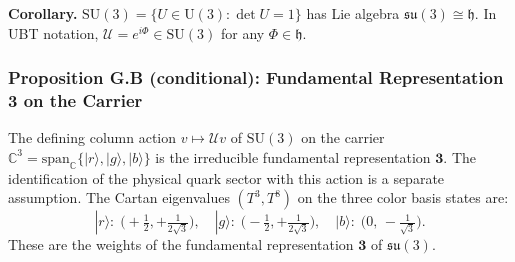 \begin{tcolorbox}[colback=blue!3!white,colframe=blue!40!black]
\textbf{Corollary.}
$\mathrm{SU}(3)=\{U\in\mathrm{U}(3):\det U=1\}$ has Lie algebra $\mathfrak{su}(3)\cong\mathfrak{h}$.
In UBT notation, $\mathcal{U}=e^{i\Phi}\in\mathrm{SU}(3)$ for any $\Phi\in\mathfrak{h}$.
\end{tcolorbox}

\subsubsection*{Proposition G.B (conditional): Fundamental Representation $\mathbf{3}$ on the Carrier}

\begin{tcolorbox}[colback=blue!3!white,colframe=blue!40!black,title=Proposition G.B (conditional on the carrier identification)]
The defining column action $v\mapsto\mathcal U v$ of $\mathrm{SU}(3)$ on the carrier
$\mathbb{C}^3 = \mathrm{span}_\mathbb{C}\{|r\rangle,|g\rangle,|b\rangle\}$
is the irreducible fundamental representation $\mathbf{3}$. The identification
of the physical quark sector with this action is a separate assumption.
The Cartan eigenvalues $(T^3,T^8)$ on the three color basis states are:
\[
|r\rangle:\;\bigl(+\tfrac{1}{2},+\tfrac{1}{2\sqrt{3}}\bigr),\quad
|g\rangle:\;\bigl(-\tfrac{1}{2},+\tfrac{1}{2\sqrt{3}}\bigr),\quad
|b\rangle:\;\bigl(0,\,-\tfrac{1}{\sqrt{3}}\bigr).
\]
These are the weights of the fundamental representation $\mathbf{3}$ of $\mathfrak{su}(3)$.
\end{tcolorbox}

